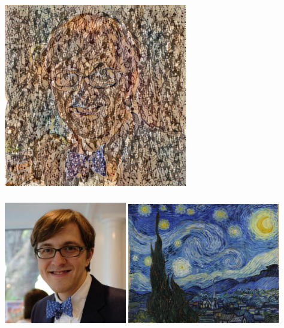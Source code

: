 \documentclass[xetex,mathserif,serif,aspectratio=169]{beamer}
\begin{document}
\begin{frame}[fragile] \frametitle{} \oldB \small

\begin{center}
\includegraphics[width=0.6\textwidth]{img/me_pollock.png}
\end{center}

\end{frame}

\begin{frame}[fragile] \frametitle{} \oldB \small

\includegraphics[width=0.4\textwidth]{img/me.png}
\includegraphics[width=0.5\textwidth]{img/stary.jpg}

\end{frame}
\end{document}
